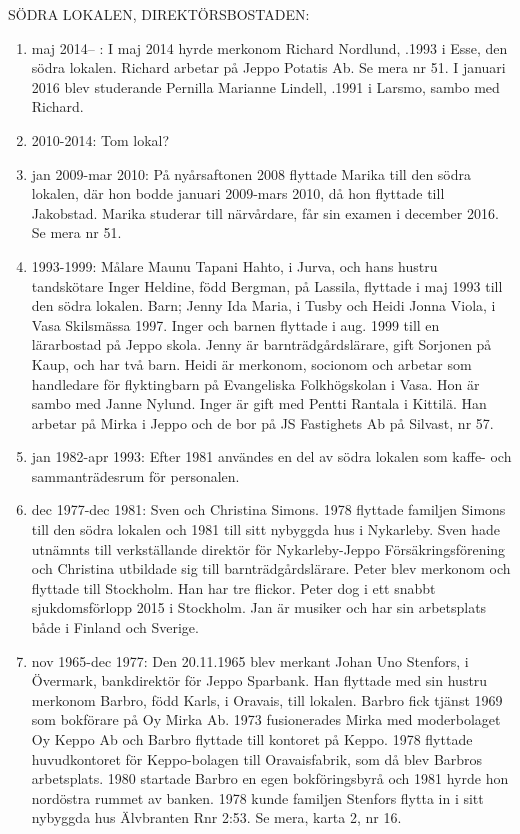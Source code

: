 SÖDRA LOKALEN, DIREKTÖRSBOSTADEN:
\begin{enumerate}
  \item 	maj 2014--  : I maj 2014 hyrde merkonom Richard Nordlund, .1993 i Esse, den södra lokalen. Richard arbetar på Jeppo Potatis Ab. Se mera nr 51. I januari 2016 blev studerande Pernilla Marianne Lindell, .1991 i Larsmo, sambo med Richard.
  \item 2010-2014: Tom lokal?
  \item jan 2009-mar 2010: På nyårsaftonen 2008 flyttade Marika till den södra lokalen, där hon bodde januari 2009-mars 2010, då hon flyttade till Jakobstad. Marika studerar till närvårdare, får sin examen i december 2016. Se mera nr 51.
  \item 1993-1999: Målare Maunu Tapani Hahto,  i Jurva, och hans hustru tandskötare Inger Heldine, född Bergman,  på Lassila, flyttade i maj 1993 till den södra lokalen.
  Barn;	Jenny Ida Maria,	 i Tusby och	Heidi Jonna Viola,	 i Vasa
  Skilsmässa 1997. Inger och barnen flyttade i aug. 1999 till en lärarbostad på Jeppo skola. Jenny är barnträdgårdslärare, gift Sorjonen på Kaup, och har två barn. Heidi är merkonom, socionom och arbetar som handledare för flyktingbarn på Evangeliska Folkhögskolan i Vasa. Hon är sambo med Janne Nylund. Inger är gift med Pentti Rantala  i Kittilä. Han arbetar på Mirka i Jeppo och de bor på JS Fastighets Ab på Silvast, nr 57.
  \item jan 1982-apr 1993: Efter 1981 användes en del av södra lokalen som kaffe- och sammanträdesrum för personalen.
  \item dec 1977-dec 1981: Sven och Christina Simons. 1978 flyttade familjen Simons till den södra lokalen och 1981 till sitt nybyggda hus i Nykarleby. Sven hade utnämnts till verkställande direktör för Nykarleby-Jeppo Försäkringsförening och Christina utbildade sig till barnträdgårdslärare. Peter blev merkonom och flyttade till Stockholm. Han har tre flickor. Peter dog i ett snabbt sjukdomsförlopp 2015 i Stockholm. Jan är musiker och har sin arbetsplats både i Finland och Sverige.
  \item nov 1965-dec 1977: 	Den 20.11.1965 blev merkant Johan Uno Stenfors,  i Övermark, bankdirektör för Jeppo Sparbank. Han flyttade med sin hustru merkonom Barbro, född Karls,  i Oravais, till lokalen. Barbro fick tjänst 1969 som bokförare på Oy Mirka Ab. 1973 fusionerades Mirka med moderbolaget Oy Keppo Ab och Barbro flyttade till kontoret på Keppo. 1978 flyttade huvudkontoret för Keppo-bolagen till Oravaisfabrik, som då blev Barbros arbetsplats. 1980 startade Barbro en egen bokföringsbyrå och 1981 hyrde hon nordöstra rummet av banken. 1978 kunde familjen Stenfors flytta in i sitt nybyggda hus Älvbranten Rnr 2:53. Se mera, karta 2, nr 16.

\end{enumerate}
